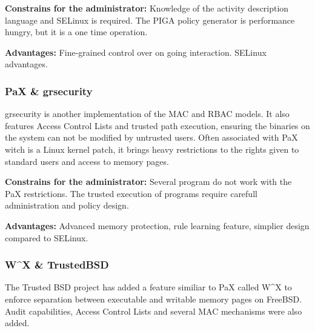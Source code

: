 \documentclass[pdftex,a4paper,titlepage,11pt]{article}
\begin{document}
\begin{list}{}{}
	\item \textbf{Constrains for the administrator:} Knowledge of
the activity description language and SELinux is required. The PIGA policy
generator is performance hungry, but it is a one time operation.
	\item \textbf{Advantages:} Fine-grained control over on going interaction.
SELinux advantages.
\end{list}

\subsubsection{PaX \& grsecurity}

grsecurity \cite{grsecuritywebsite} is another implementation of the MAC and
RBAC models. It also features Access Control Lists and trusted path execution,
ensuring the binaries on the system can not be modified by untrusted users.
Often associated with PaX witch is a Linux kernel patch, it brings heavy
restrictions to the rights given to standard users and access to memory pages.

\begin{list}{}{}
	\item \textbf{Constrains for the administrator:} Several program do
not work with the PaX restrictions. The trusted execution of programs require
carefull administration and policy design.
	\item \textbf{Advantages:} Advanced memory protection, rule learning
feature, simplier design compared to SELinux.
\end{list}

\subsubsection{W\^{}X \& TrustedBSD}

The Trusted BSD project \cite{trustedbsdproject} has added a feature
similiar to PaX called W\^{}X to enforce separation between executable and
writable memory pages on FreeBSD. Audit capabilities, Access Control Lists and
several MAC mechanisms were also added.
\end{document}
